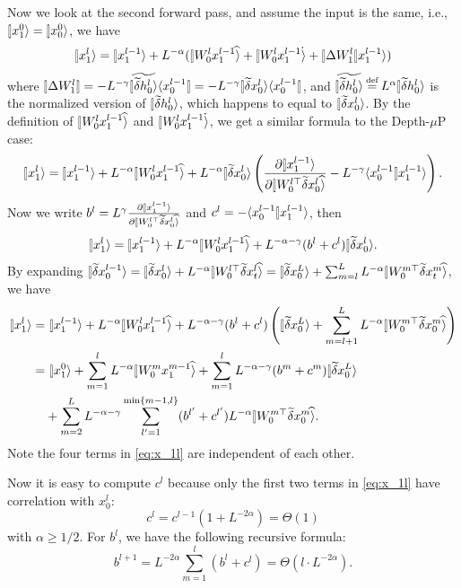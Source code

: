 \documentclass{article}
\theoremstyle{plain}
\theoremstyle{definition}
\begin{document}
Now we look at the second forward pass, and assume the input is the same, i.e., $\ket{x_1^0}=\ket{x_0^0}$, we have
\[\ket{x_1^l} = \ket{x_1^{l-1}} + L^{-\alpha} (\hatket{W_0^l x_1^{l-1}} + \dotket{W_0^l x_1^{l-1}}+ \oplim{\Delta W_1^l} x_1^{l-1}\ra)\]
where $\oplim{\Delta W_1^l}= -L^{-\gamma} \Tilde{\ket{\tilde \delta h_0^l}}\bra{x_0^{l-1}}=-L^{-\gamma} \ket{\tilde \delta x_0^l}\bra{x_0^{l-1}}$, and $\Tilde{\ket{\tilde \delta h_0^l}}\odefeq L^{\alpha} \ket{\tilde \del h_0^l}$ is the normalized version of $\ket{\tilde \del h_0^l}$, which happens to equal to $\ket{\tilde \del x_0^l}$. By the definition of $\hatket{W_0^l x_1^{l-1}}$ and $\dotket{W_0^l x_1^{l-1}}$, we get a similar formula to the Depth-$\mu$P case:
\[\ket{x_1^l} = \ket{x_1^{l-1}} + L^{-\alpha} \hatket{W_0^l x_1^{l-1}} + L^{-\alpha} \ket{\tilde \del x_0^{l}} \left(\frac{\partial \ket{x_1^{l-1}}}{\partial \hatket{W_0^{l\top} \tilde \del x_0^{l}}} - L^{-\gamma} \braket{x_0^{l-1}}{x_1^{l-1}} \right).\]
Now we write $b^l=L^{\gamma} \frac{\partial \ket{x_1^{l-1}}}{\partial \hatket{W_0^{l\top} \tilde \del x_0^{l}}}$ and $c^l=- \braket{x_0^{l-1}}{x_1^{l-1}}$, then
\[\ket{x_1^{l}}=\ket{x_1^{l-1}} + L^{-\alpha} \hatket{W_0^l x_1^{l-1}} + L^{-\alpha-\gamma}(b^l + c^l)\ket{\tilde \del x_0^l}.\]
By expanding $\ket{\tilde \del x_0^{l-1}}=\ket{\tilde \del x_0^{l}} + L^{-\alpha} \hatket{W_0^{l\top}\tilde \del x_t^l}=\ket{\tilde \del x_0^L} + \sum_{m=l}^L L^{-\alpha} \hatket{W_0^{m\top}\tilde \del x_t^m}$, 
we have 
\begin{align}
    \ket{x_1^{l}}=&~\ket{x_1^{l-1}} + L^{-\alpha} \hatket{W_0^l x_1^{l-1}} + L^{-\alpha-\gamma}(b^l + c^l)\left(\ket{\tilde \del x_0^L} + \sum_{m=l+1}^L L^{-\alpha} \hatket{W_0^{m\top}\tilde \del x_0^m}\right) \nonumber \\
    =&~ \ket{x_1^{0}} + \sum_{m=1}^l L^{-\alpha} \hatket{W_0^m x_1^{m-1}} + \sum_{m=1}^l L^{-\alpha-\gamma} (b^m +c^m)\ket{\tilde \del x_0^L} \nonumber\\
    & + \sum_{m=2}^L L^{-\alpha-\gamma} \sum_{l'=1}^{\min\{m-1,l\}} (b^{l'}+c^{l'}) L^{-\alpha} \hatket{W_0^{m\top}\tilde \del x_0^m}.\label{eq:x_1l}
\end{align}
Note the four terms in \cref{eq:x_1l} are independent of each other.

Now it is easy to compute $c^l$ because only the first two terms in \cref{eq:x_1l} have correlation with $x_0^l$:
\[c^l =c^{l-1} (1+ L^{-2\alpha})=\Theta(1)\]
with $\alpha \geq 1/2$.
For $b^l$, we have the following recursive formula:
\[b^{l+1}=L^{-2\alpha} \sum_{m=1}^l (b^l+c^l)=\Theta(l\cdot L^{-2\alpha}).\]
\end{document}
